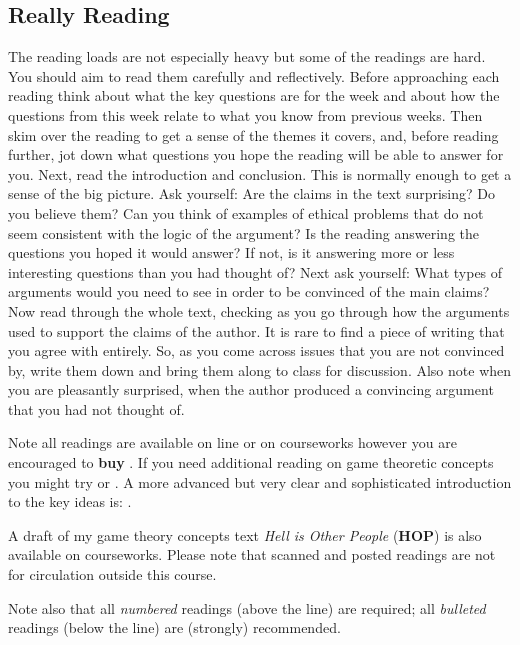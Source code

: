 \documentclass[11pt]{article}
\begin{document}
\subsection*{Really Reading}
The reading loads are not especially heavy but some of the readings are hard. You should aim to read them carefully and reflectively. Before approaching each reading think about what the key questions are for the week and about how the questions from this week relate to what you know from previous weeks. Then skim over the reading to get a sense of the themes it covers, and, before reading further, jot down what questions you hope the reading will be able to answer for you. Next, read the introduction and conclusion. This is normally enough to get a sense of the big picture. Ask yourself: Are the claims in the text surprising? Do you believe them? Can you think of examples of ethical problems that do not seem consistent with the logic of the argument? Is the reading answering the questions you hoped it would answer? If not, is it answering more or less interesting questions than you had thought of? Next ask yourself: What types of arguments would you need to see in order to be convinced of the main claims? Now read through the whole text, checking as you go through how the arguments used to support the claims of the author. It is rare to find a piece of writing that you agree with entirely. So, as you come across issues that you are not convinced by, write them down and bring them along to class for discussion. Also note when you are pleasantly surprised, when the author produced a convincing argument that you had not thought of. 

Note all readings are available on line or on courseworks however you are encouraged to \textbf{buy} . If you need additional reading on game theoretic concepts  you might try
 or  . A more advanced but very clear and sophisticated introduction to the key ideas is: .


A draft of my game theory concepts text \textit{Hell is Other People} (\textbf{{HOP}}) is also available on courseworks. Please note that scanned and posted readings are not for circulation outside this course.
 
Note also that all \textit{numbered} readings (above the line) are required; all \textit{bulleted} readings (below the line) are (strongly) recommended. 



\newpage
\end{document}
